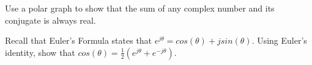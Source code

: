 \begin{enumerate}[resume]

\qitem Use a polar graph to show that the sum of any complex number and its conjugate is always real.

\sol{

}

\qitem Recall that Euler's Formula states that $e^{j\theta} = cos(\theta) + jsin(\theta)$.
Using Euler's identity, show that $cos(\theta) = \frac{1}{2}(e^{j\theta} + e^{-j\theta})$.


\end{enumerate}
